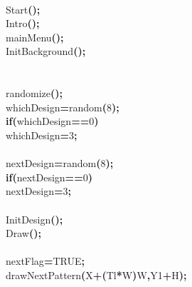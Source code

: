 \documentclass[a4paper, 10pt]{article}
\newcommand\SPC{\hspace*{0.6em}}
\newcommand\HYP{\mbox{\char 45}}
\newcommand{\CppAIdentifier}[1]{#1}
\newcommand{\CppANumber}[1]{\textcolor[rgb]{0.5,0,0.5}{#1}}
\newcommand{\CppAReservedWord}[1]{\textbf{#1}}
\newcommand{\CppASpace}[1]{\colorbox[rgb]{1,1,1}{#1}}
\newcommand{\CppASymbol}[1]{\textbf{\textcolor[rgb]{1,0,0}{#1}}}
\begin{document}
\begin{ttfamily}
\\
\CppASpace{\SPC }\CppAIdentifier{Start}\CppASymbol{(}\CppASymbol{)}\CppASymbol{;}\\
\CppASpace{\SPC }\CppAIdentifier{Intro}\CppASymbol{(}\CppASymbol{)}\CppASymbol{;}\\
\CppASpace{\SPC }\CppAIdentifier{mainMenu}\CppASymbol{(}\CppASymbol{)}\CppASymbol{;}\\
\CppASpace{\SPC }\CppAIdentifier{InitBackground}\CppASymbol{(}\CppASymbol{)}\CppASymbol{;}\\
\\
\\
\CppASpace{\SPC }\CppAIdentifier{randomize}\CppASymbol{(}\CppASymbol{)}\CppASymbol{;}\\
\CppASpace{\SPC }\CppAIdentifier{whichDesign}\CppASymbol{=}\CppAIdentifier{random}\CppASymbol{(}\CppANumber{8}\CppASymbol{)}\CppASymbol{;}\\
\CppASpace{\SPC }\CppAReservedWord{if}\CppASymbol{(}\CppAIdentifier{whichDesign}\CppASymbol{==}\CppANumber{0}\CppASymbol{)}\\
\CppASpace{\SPC \SPC }\CppAIdentifier{whichDesign}\CppASymbol{=}\CppANumber{3}\CppASymbol{;}\\
\\
\CppASpace{\SPC }\CppAIdentifier{nextDesign}\CppASymbol{=}\CppAIdentifier{random}\CppASymbol{(}\CppANumber{8}\CppASymbol{)}\CppASymbol{;}\\
\CppASpace{\SPC }\CppAReservedWord{if}\CppASymbol{(}\CppAIdentifier{nextDesign}\CppASymbol{==}\CppANumber{0}\CppASymbol{)}\\
\CppASpace{\SPC \SPC }\CppAIdentifier{nextDesign}\CppASymbol{=}\CppANumber{3}\CppASymbol{;}\\
\\
\CppASpace{\SPC }\CppAIdentifier{InitDesign}\CppASymbol{(}\CppASymbol{)}\CppASymbol{;}\\
\CppASpace{\SPC }\CppAIdentifier{Draw}\CppASymbol{(}\CppASymbol{)}\CppASymbol{;}\\
\\
\CppASpace{\SPC }\CppAIdentifier{nextFlag}\CppASymbol{=}\CppAIdentifier{TRUE}\CppASymbol{;}\\
\CppASpace{\SPC }\CppAIdentifier{drawNextPattern}\CppASymbol{(}\CppAIdentifier{X}\CppASymbol{+}\CppASymbol{(}\CppAIdentifier{Tl}\CppASymbol{*}\CppAIdentifier{W}\CppASymbol{)}\CppASymbol{\HYP }\CppAIdentifier{W}\CppASymbol{,}\CppAIdentifier{Y}\CppASymbol{\HYP }\CppANumber{1}\CppASymbol{+}\CppAIdentifier{H}\CppASymbol{)}\CppASymbol{;}\\

\end{ttfamily}
\end{document}
